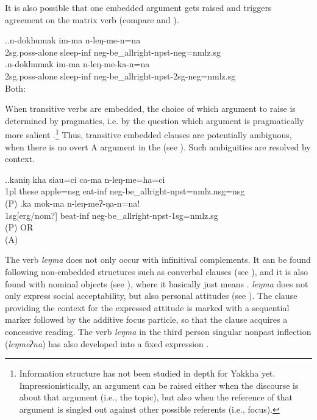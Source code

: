 It is also possible that one embedded argument gets raised and triggers agreement on the matrix verb (compare \Next[a] and \Next[b]). 

\ex.\ag.n-dokhumak im-ma n-leŋ-me-n=na\\
{\sc 2sg.poss-}alone sleep{\sc -inf} {\sc neg-}be\_allright{\sc [3sg]-npst-neg=nmlz.sg}\\
\bg.n-dokhumak im-ma n-leŋ-me-ka-n=na\\
{\sc 2sg.poss-}alone sleep{\sc -inf} {\sc neg-}be\_allright{\sc -npst-2sg-neg=nmlz.sg}\\
Both: 


When transitive verbs are embedded, the choice of which argument to raise is determined by pragmatics, i.e. by the question which argument is pragmatically more salient \Next.\footnote{Information structure has not been studied in depth for Yakkha yet. Impressionistically, an argument can be raised either when the discourse is about that argument (i.e., the topic), but also when the reference of that argument is singled out against other possible referents (i.e., focus).} Thus, transitive embedded clauses are potentially  ambiguous, when there is no overt A argument in the  (see \Next[b]). Such ambiguities are resolved by context.

\ex.\ag.kaniŋ kha siau=ci ca-ma n-leŋ-me=ha=ci\\
{\sc 1pl} these apple{\sc =nsg} eat{\sc -inf} {\sc neg-}be\_allright{\sc -npst=nmlz.nsg=nsg}\\
 (P)
\bg.ka mok-ma n-leŋ-meʔ-ŋa-n=na!\\
{\sc 1sg[erg/nom?]} beat{\sc -inf} {\sc neg-}be\_allright{\sc -npst-1sg=nmlz.sg}\\
 (P) OR\\
 (A)


The verb \emph{leŋma} does not only occur with infinitival complements. It can be found following non-embedded structures such as converbal clauses (see \Next[a]), and it is also found with nominal objects (see \Next[b]), where it basically just means . \emph{leŋma} does not only express social acceptability, but also personal attitudes (see \Next[c]). The clause providing the context for the expressed attitude is marked with a sequential marker followed by the additive focus particle, so that the clause acquires a concessive reading. The verb \emph{leŋma} in the third person singular nonpast inflection (\emph{leŋmeʔna}) has also developed into a fixed expression . 
	

